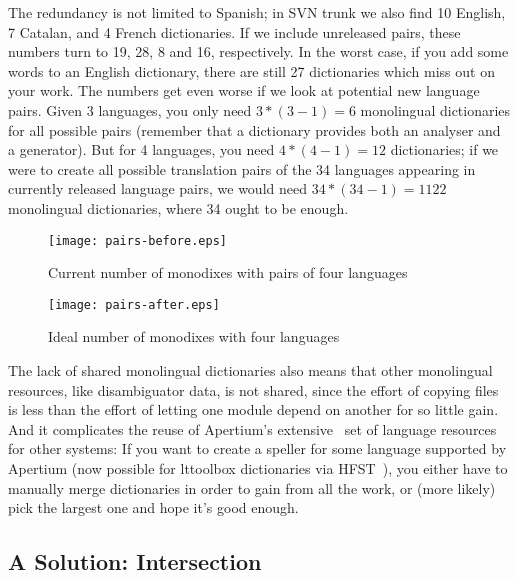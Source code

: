 \documentclass[10pt, a4paper]{article}
\begin{document}
The redundancy is not limited to Spanish; in SVN trunk we also find 10
English, 7 Catalan, and 4 French dictionaries. If we include
unreleased pairs, these numbers turn to 19, 28, 8 and 16,
respectively. In the worst case, if you add some words to an English
dictionary, there are still 27 dictionaries which miss out on your
work. The numbers get even worse if we look at potential new language
pairs. Given 3 languages, you only need $3*(3-1)=6$ monolingual
dictionaries for all possible pairs (remember that a dictionary
provides both an analyser and a generator). But for 4 languages, you
need $4*(4-1)=12$ dictionaries; if we were to create all possible
translation pairs of the 34 languages appearing in currently released
language pairs, we would need $34*(34-1)=1122$ monolingual
dictionaries, where 34 ought to be enough.

\begin{figure}[h]
  \begin{center}
    \texttt{[image: pairs-before.eps]}
    \caption{Current number of monodixes with pairs of four languages}
    \label{fig:monodixes-current}
  \end{center}
\end{figure}

\begin{figure}[h]
  \begin{center}
    \texttt{[image: pairs-after.eps]}
    \caption{Ideal number of monodixes with four languages}
    \label{fig:monodixes-ideally}
  \end{center}
\end{figure}

The lack of shared monolingual dictionaries also means that other
monolingual resources, like disambiguator data, is not shared, since
the effort of copying files is less than the effort of letting one
module depend on another for so little gain. And it complicates the
reuse of Apertium's extensive~\cite{tyers2010fosresources} set of
language resources for other systems: If you want to create a speller
for some language supported by Apertium (now possible for lttoolbox
dictionaries via HFST~\cite{pirinen2012compiling}), you either have to
manually merge dictionaries in order to gain from all the work, or
(more likely) pick the largest one and hope it's good enough.

\subsection{A Solution: Intersection}
\label{sec:solution}
\end{document}
